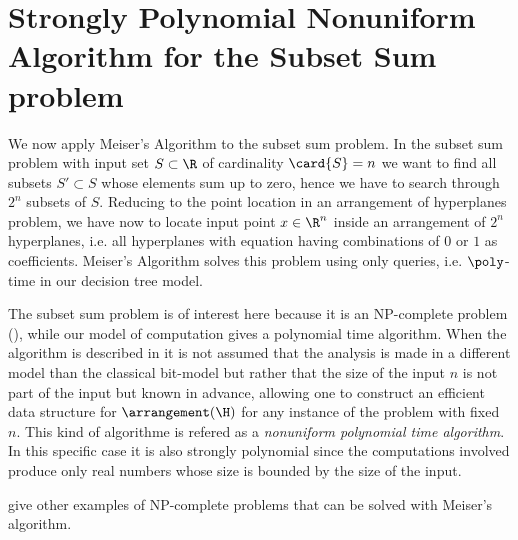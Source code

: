 \section{Strongly Polynomial Nonuniform Algorithm for the Subset Sum problem}

We now apply Meiser's Algorithm to the subset sum problem. In the subset sum
problem with input set $S \subset \R$ of cardinality $\card{S} = n$ we want to
find all subsets $S' \subset S$ whose elements sum up to zero, hence we have
to search through $2^n$ subsets of $S$. Reducing to the point location in an
arrangement of hyperplanes problem, we have now to locate input point $x \in
\R^n$ inside an arrangement of $2^n$ hyperplanes, i.e. all hyperplanes with
equation having combinations of $0$ or $1$ as coefficients. Meiser's Algorithm
solves this problem using only  queries, i.e. $\poly$-time
in our decision tree model.

The subset sum problem is of interest here because it is an NP-complete problem
(\cite{karp:1972}), while our model of computation gives a polynomial time
algorithm. When the algorithm is described in \cite{burgisser:1997} it is not
assumed that the analysis is made in a different model than the classical
bit-model but rather that the size of the input $n$ is not part of the input
but known in advance, allowing one to construct an efficient data structure for
$\arrangement(\H)$ for any instance of the problem with fixed $n$. This kind of
algorithme is refered as a \emph{nonuniform polynomial time algorithm}.  In
this specific case it is also strongly polynomial since the computations
involved produce only real numbers whose size is bounded by the size of the
input.

\citet*{meiser:1993,burgisser:1997} give other examples of
NP-complete problems that can be solved with Meiser's algorithm.
